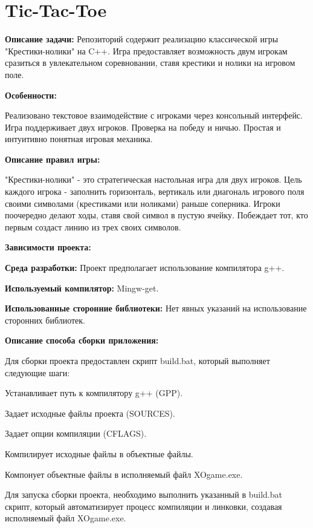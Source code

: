\chapter{Tic-\/\+Tac-\/\+Toe}
\hypertarget{md__c_1_2_users_2_lenovo_2_desktop_2_u_s_m_22_01_x_d0_x_b_a_x_d1_x83_x_d1_x80_x_d1_x81_23_01_x_d0bffc255915fb7030b56ef3e00aaf22e}{}\label{md__c_1_2_users_2_lenovo_2_desktop_2_u_s_m_22_01_x_d0_x_b_a_x_d1_x83_x_d1_x80_x_d1_x81_23_01_x_d0bffc255915fb7030b56ef3e00aaf22e}
\label{md__c_1_2_users_2_lenovo_2_desktop_2_u_s_m_22_01_x_d0_x_b_a_x_d1_x83_x_d1_x80_x_d1_x81_23_01_x_d0bffc255915fb7030b56ef3e00aaf22e_autotoc_md0}%
%
{\bfseries{Описание задачи\+:}} Репозиторий содержит реализацию классической игры "{}Крестики-\/нолики"{} на C++. Игра предоставляет возможность двум игрокам сразиться в увлекательном соревновании, ставя крестики и нолики на игровом поле.

{\bfseries{Особенности\+:}}

Реализовано текстовое взаимодействие с игроками через консольный интерфейс. Игра поддерживает двух игроков. Проверка на победу и ничью. Простая и интуитивно понятная игровая механика.

{\bfseries{Описание правил игры\+:}}

"{}Крестики-\/нолики"{} -\/ это стратегическая настольная игра для двух игроков. Цель каждого игрока -\/ заполнить горизонталь, вертикаль или диагональ игрового поля своими символами (крестиками или ноликами) раньше соперника. Игроки поочередно делают ходы, ставя свой символ в пустую ячейку. Побеждает тот, кто первым создаст линию из трех своих символов.

{\bfseries{Зависимости проекта\+:}}


\begin{DoxyItemize}
\item {\bfseries{Среда разработки\+:}} Проект предполагает использование компилятора g++.
\item {\bfseries{Используемый компилятор\+:}} Mingw-\/get.
\item {\bfseries{Использованные сторонние библиотеки\+:}} Нет явных указаний на использование сторонних библиотек.
\end{DoxyItemize}

{\bfseries{Описание способа сборки приложения\+:}}

Для сборки проекта предоставлен скрипт {\ttfamily build.\+bat}, который выполняет следующие шаги\+:
\begin{DoxyEnumerate}
\item Устанавливает путь к компилятору g++ ({\ttfamily GPP}).
\item Задает исходные файлы проекта ({\ttfamily SOURCES}).
\item Задает опции компиляции ({\ttfamily CFLAGS}).
\item Компилирует исходные файлы в объектные файлы.
\item Компонует объектные файлы в исполняемый файл {\ttfamily XOgame.\+exe}.
\end{DoxyEnumerate}

Для запуска сборки проекта, необходимо выполнить указанный в {\ttfamily build.\+bat} скрипт, который автоматизирует процесс компиляции и линковки, создавая исполняемый файл {\ttfamily XOgame.\+exe}. 
